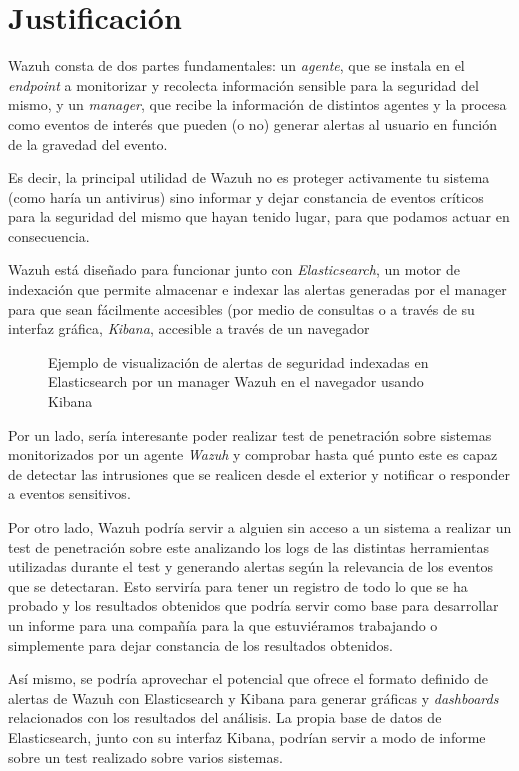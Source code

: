 \section{Justificación}

Wazuh consta de dos partes fundamentales: un \textit{agente}, que se instala en el \textit{endpoint} a monitorizar y recolecta información sensible para la seguridad del mismo, y un \textit{manager}, que recibe la información de distintos agentes y la procesa como eventos de interés que pueden (o no) generar alertas al usuario en función de la gravedad del evento.

Es decir, la principal utilidad de Wazuh no es proteger activamente tu sistema (como haría un antivirus) sino informar y dejar constancia de eventos críticos para la seguridad del mismo que hayan tenido lugar, para que podamos actuar en consecuencia.

Wazuh está diseñado para funcionar junto con \textit{Elasticsearch}, un motor de indexación que permite almacenar e indexar las alertas generadas por el manager para que sean fácilmente accesibles (por medio de consultas o a través de su interfaz gráfica, \textit{Kibana}, accesible a través de un navegador

\begin{figure}[hbt]
  \centering
  \caption{Ejemplo de visualización de alertas de seguridad indexadas en Elasticsearch por un manager Wazuh en el navegador usando Kibana}
\end{figure}

Por un lado, sería interesante poder realizar test de penetración sobre sistemas monitorizados por un agente \textit{Wazuh} y comprobar hasta qué punto este es capaz de detectar las intrusiones que se realicen desde el exterior y notificar o responder a eventos sensitivos.

Por otro lado, Wazuh podría servir a alguien sin acceso a un sistema a realizar un test de penetración sobre este analizando los logs de las distintas herramientas utilizadas durante el test y generando alertas según la relevancia de los eventos que se detectaran. Esto serviría para tener un registro de todo lo que se ha probado y los resultados obtenidos que podría servir como base para desarrollar un informe para una compañía para la que estuviéramos trabajando o simplemente para dejar constancia de los resultados obtenidos.

Así mismo, se podría aprovechar el potencial que ofrece el formato definido de alertas de Wazuh con Elasticsearch y Kibana para generar gráficas y \textit{dashboards} relacionados con los resultados del análisis. La propia base de datos de Elasticsearch, junto con su interfaz Kibana, podrían servir a modo de informe sobre un test realizado sobre varios sistemas.

